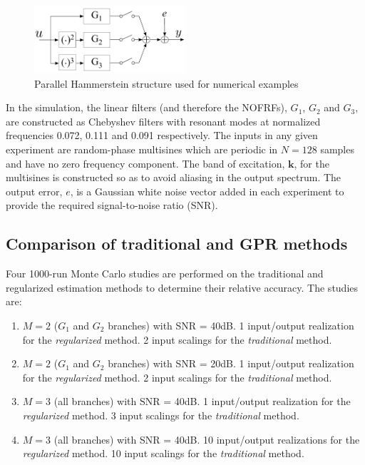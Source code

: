 \begin{figure}[h]
\centering
\includegraphics[width=0.5\textwidth]{Chapter7_NOFRFs/ParallelHammNumEx.pdf}
\caption{Parallel Hammerstein structure used for numerical examples}
\label{fig:ParallelHammNumEx}
\end{figure}

In the simulation, the linear filters (and therefore the NOFRFs), $G_1$, $G_2$ and $G_3$, are constructed as Chebyshev filters with resonant modes at normalized frequencies 0.072, 0.111 and 0.091 respectively. The inputs in any given experiment are random-phase multisines which are periodic in $N=128$ samples and have no zero frequency component. The band of excitation, $\mathbf{k}$, for the multisines is constructed so as to avoid aliasing in the output spectrum. The output error, $e$, is a Gaussian white noise vector added in each experiment to provide the required signal-to-noise ratio (SNR).

\subsection{Comparison of traditional and GPR methods}

Four 1000-run Monte Carlo studies are performed on the traditional and regularized estimation methods to determine their relative accuracy.  The studies are:
\begin{enumerate}
\item $M=2$ ($G_1$ and $G_2$ branches) with SNR = 40dB. 1 input/output realization for the \emph{regularized} method. 2 input scalings for the \emph{traditional} method. 
\item $M=2$ ($G_1$ and $G_2$ branches) with SNR = 20dB. 1 input/output realization for the \emph{regularized} method. 2 input scalings for the \emph{traditional} method. 
\item $M=3$ (all branches) with SNR = 40dB. 1 input/output realization for the \emph{regularized} method. 3 input scalings for the \emph{traditional} method. 
\item $M=3$ (all branches) with SNR = 40dB. 10 input/output realizations for the \emph{regularized} method. 10 input scalings for the \emph{traditional} method. 
\end{enumerate}

